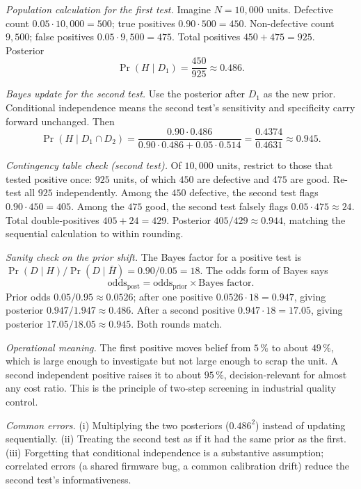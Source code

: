 \textit{Population calculation for the first test.} Imagine
$N = 10{,}000$ units. Defective count $0.05 \cdot 10{,}000 = 500$;
true positives $0.90 \cdot 500 = 450$. Non-defective count
$9{,}500$; false positives $0.05 \cdot 9{,}500 = 475$. Total
positives $450 + 475 = 925$. Posterior
\[
\Pr(H \mid D_{1}) = \frac{450}{925} \approx 0.486.
\]

\textit{Bayes update for the second test.} Use the posterior after
$D_{1}$ as the new prior. Conditional independence means the second
test's sensitivity and specificity carry forward unchanged. Then
\[
\Pr(H \mid D_{1} \cap D_{2})
= \frac{0.90 \cdot 0.486}{0.90 \cdot 0.486 + 0.05 \cdot 0.514}
= \frac{0.4374}{0.4631}
\approx 0.945.
\]

\textit{Contingency table check (second test).} Of $10{,}000$
units, restrict to those that tested positive once: $925$ units, of
which $450$ are defective and $475$ are good. Re-test all $925$
independently. Among the $450$ defective, the second test flags
$0.90 \cdot 450 = 405$. Among the $475$ good, the second test
falsely flags $0.05 \cdot 475 \approx 24$. Total double-positives
$405 + 24 = 429$. Posterior $405/429 \approx 0.944$, matching the
sequential calculation to within rounding.

\textit{Sanity check on the prior shift.} The Bayes factor for a
positive test is $\Pr(D \mid H)/\Pr(D \mid \bar{H})
= 0.90/0.05 = 18$. The odds form of Bayes says
\[
\text{odds}_{\text{post}} = \text{odds}_{\text{prior}} \times
\text{Bayes factor}.
\]
Prior odds $0.05/0.95 \approx 0.0526$; after one positive
$0.0526 \cdot 18 = 0.947$, giving posterior $0.947/1.947 \approx
0.486$. After a second positive $0.947 \cdot 18 = 17.05$, giving
posterior $17.05/18.05 \approx 0.945$. Both rounds match.

\textit{Operational meaning.} The first positive moves belief from
$5 \,\%$ to about $49 \,\%$, which is large enough to investigate
but not large enough to scrap the unit. A second independent
positive raises it to about $95 \,\%$, decision-relevant for almost
any cost ratio. This is the principle of two-step screening in
industrial quality control.

\textit{Common errors.} (i) Multiplying the two posteriors
($0.486^{2}$) instead of updating sequentially. (ii) Treating the
second test as if it had the same prior as the first. (iii)
Forgetting that conditional independence is a substantive
assumption; correlated errors (a shared firmware bug, a common
calibration drift) reduce the second test's informativeness.

